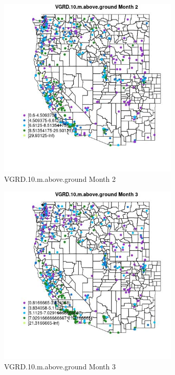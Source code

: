 \begin{figure} 
\centering  
\includegraphics[width=0.77\textwidth]{Code_Outputs/ML_input_report_ML_input_PM25_Step5_part_d_de_duplicated_aves_ML_input_MapObsMo2VGRD10maboveground.jpg} 
\caption{\label{fig:ML_input_report_ML_input_PM25_Step5_part_d_de_duplicated_aves_ML_inputMapObsMo2VGRD10maboveground}VGRD.10.m.above.ground Month 2} 
\end{figure} 
 

\begin{figure} 
\centering  
\includegraphics[width=0.77\textwidth]{Code_Outputs/ML_input_report_ML_input_PM25_Step5_part_d_de_duplicated_aves_ML_input_MapObsMo3VGRD10maboveground.jpg} 
\caption{\label{fig:ML_input_report_ML_input_PM25_Step5_part_d_de_duplicated_aves_ML_inputMapObsMo3VGRD10maboveground}VGRD.10.m.above.ground Month 3} 
\end{figure} 
 

